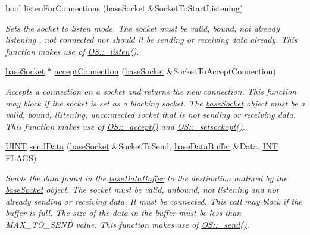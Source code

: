 \begin{DoxyCompactItemize}
bool \hyperlink{class_communication_1_1base_gateway_a1afc237866f0ecb37bff899567e684df}{listen\+For\+Connections} (\hyperlink{class_communication_1_1base_socket}{base\+Socket} \&Socket\+To\+Start\+Listening)
\begin{DoxyCompactList}\small\item\em Sets the socket to listen mode. The socket must be valid, bound, not already listening , not connected nor should it be sending or receiving data already. This function makes use of \hyperlink{class_communication_1_1_o_s_add79085b739cd0b0f7300f10eee920c5}{O\+S\+::\+\_\+listen()}. \end{DoxyCompactList}\item 
\hyperlink{class_communication_1_1base_socket}{base\+Socket} $\ast$ \hyperlink{class_communication_1_1base_gateway_ae4fc465b7b804c358590019440048c01}{accept\+Connection} (\hyperlink{class_communication_1_1base_socket}{base\+Socket} \&Socket\+To\+Accept\+Connection)
\begin{DoxyCompactList}\small\item\em Accepts a connection on a socket and returns the new connection. This function may block if the socket is set as a blocking socket. The \hyperlink{class_communication_1_1base_socket}{base\+Socket} object must be a valid, bound, listening, unconnected socket that is not sending or receiving data. This function makes use of \hyperlink{class_communication_1_1_o_s_a449cc9a8cd90440f7ca83315bceabebf}{O\+S\+::\+\_\+accept()} and \hyperlink{class_communication_1_1_o_s_a346bdb63997895b796df07e0484cc466}{O\+S\+::\+\_\+setsockopt()}. \end{DoxyCompactList}\item 
\hyperlink{typedefs_8h_a2e2c38961834f28c06e17e074eb00bc7}{U\+I\+N\+T} \hyperlink{class_communication_1_1base_gateway_a7f5d58eaadea6e124f065f263f2b8029}{send\+Data} (\hyperlink{class_communication_1_1base_socket}{base\+Socket} \&Socket\+To\+Send, \hyperlink{class_communication_1_1base_data_buffer}{base\+Data\+Buffer} \&Data, \hyperlink{typedefs_8h_a0240b856f74f8905ed334a5a0ca624e5}{I\+N\+T} F\+L\+A\+G\+S)
\begin{DoxyCompactList}\small\item\em Sends the data found in the \hyperlink{class_communication_1_1base_data_buffer}{base\+Data\+Buffer} to the destination outlined by the \hyperlink{class_communication_1_1base_socket}{base\+Socket} object. The socket must be valid, unbound, not listening and not already sending or receiving data. It must be connected. This call may block if the buffer is full. The size of the data in the buffer must be less than M\+A\+X\+\_\+\+T\+O\+\_\+\+S\+E\+N\+D value. This function makes use of \hyperlink{class_communication_1_1_o_s_af6ca3ef21b995019d6d8bbf86204ba80}{O\+S\+::\+\_\+send()}. \end{DoxyCompactList}\item 

\end{DoxyCompactItemize}
